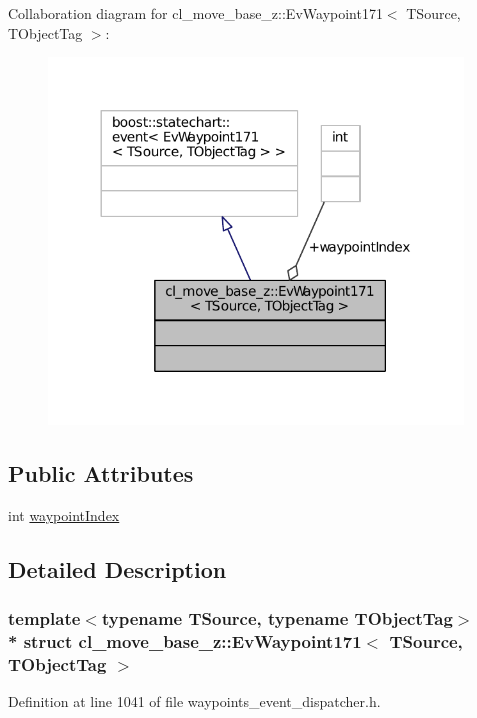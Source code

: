 Collaboration diagram for cl\+\_\+move\+\_\+base\+\_\+z\+:\+:Ev\+Waypoint171$<$ T\+Source, T\+Object\+Tag $>$\+:
\nopagebreak
\begin{figure}[H]
\begin{center}
\leavevmode
\includegraphics[width=312pt]{structcl__move__base__z_1_1EvWaypoint171__coll__graph}
\end{center}
\end{figure}
\subsection*{Public Attributes}
\begin{DoxyCompactItemize}
\item 
int \hyperlink{structcl__move__base__z_1_1EvWaypoint171_aed2adc34b55acddbb291cf4c783833d1}{waypoint\+Index}
\end{DoxyCompactItemize}


\subsection{Detailed Description}
\subsubsection*{template$<$typename T\+Source, typename T\+Object\+Tag$>$\\*
struct cl\+\_\+move\+\_\+base\+\_\+z\+::\+Ev\+Waypoint171$<$ T\+Source, T\+Object\+Tag $>$}



Definition at line 1041 of file waypoints\+\_\+event\+\_\+dispatcher.\+h.



